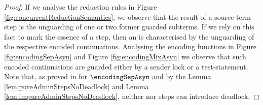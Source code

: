 \documentclass[]{llncs}
\begin{document}
\begin{proof}
	If we analyse the reduction rules in Figure \ref{fig:concurrentReductionSemantics}, we observe that the result of a source term step is the unguarding of one or two former guarded subterms. If we rely on this fact to mark the essence of a step, then an \simulation is characterised by the unguarding of the respective encoded continuations. Analysing the encoding functions in Figure \ref{fig:encodingSepAsyn} and Figure \ref{fig:encodingMixAsyn} we observe that such encoded continuations are guarded either by a sender lock or a test-statement. Note that, as proved in \cite{nestmann00} for $ \encodingSepAsyn $ and by the Lemma \ref{lem:pureAdminStepsNoDeadlock} and Lemma \ref{lem:impureAdminStepsNoDeadlock}, neither \pure nor \impure \admin steps can introduce deadlock.
	

\end{proof}
\end{document}
